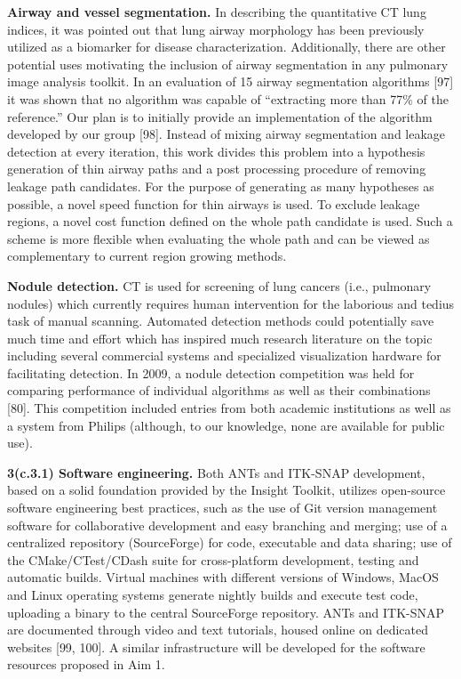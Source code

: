 \documentclass[11pt,]{article}
\begin{document}
\textbf{Airway and vessel segmentation.} In describing the quantitative
CT lung indices, it was pointed out that lung airway morphology has been
previously utilized as a biomarker for disease characterization.
Additionally, there are other potential uses motivating the inclusion of
airway segmentation in any pulmonary image analysis toolkit. In an
evaluation of 15 airway segmentation algorithms {[}97{]} it was shown
that no algorithm was capable of ``extracting more than 77\% of the
reference.'' Our plan is to initially provide an implementation of the
algorithm developed by our group {[}98{]}. Instead of mixing airway
segmentation and leakage detection at every iteration, this work divides
this problem into a hypothesis generation of thin airway paths and a
post processing procedure of removing leakage path candidates. For the
purpose of generating as many hypotheses as possible, a novel speed
function for thin airways is used. To exclude leakage regions, a novel
cost function defined on the whole path candidate is used. Such a scheme
is more flexible when evaluating the whole path and can be viewed as
complementary to current region growing methods.

\textbf{Nodule detection.} CT is used for screening of lung cancers
(i.e., pulmonary nodules) which currently requires human intervention
for the laborious and tedius task of manual scanning. Automated
detection methods could potentially save much time and effort which has
inspired much research literature on the topic including several
commercial systems and specialized visualization hardware for
facilitating detection. In 2009, a nodule detection competition was held
for comparing performance of individual algorithms as well as their
combinations {[}80{]}. This competition included entries from both
academic institutions as well as a system from Philips (although, to our
knowledge, none are available for public use).

\textbf{3(c.3.1) Software engineering.} Both ANTs and ITK-SNAP
development, based on a solid foundation provided by the Insight
Toolkit, utilizes open-source software engineering best practices, such
as the use of Git version management software for collaborative
development and easy branching and merging; use of a centralized
repository (SourceForge) for code, executable and data sharing; use of
the CMake/CTest/CDash suite for cross-platform development, testing and
automatic builds. Virtual machines with different versions of Windows,
MacOS and Linux operating systems generate nightly builds and execute
test code, uploading a binary to the central SourceForge repository.
ANTs and ITK-SNAP are documented through video and text tutorials,
housed online on dedicated websites {[}99, 100{]}. A similar
infrastructure will be developed for the software resources proposed in
Aim 1.
\end{document}

